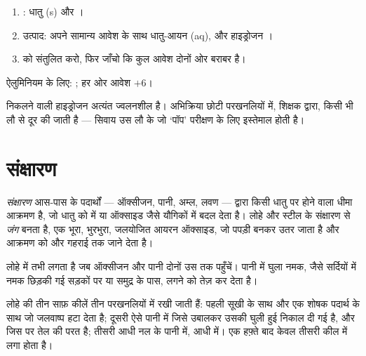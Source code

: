 \begin{method}[अम्ल के साथ धातु का समीकरण लिखना]\label{met:g9:metals-acids-corrosion:write}
\begin{enumerate}
  \item {}: धातु (s) और  ।
  \item उत्पाद: अपने सामान्य आवेश के साथ धातु-आयन (aq), और
        हाइड्रोजन ।
  \item {} को संतुलित करो, फिर जाँचो कि कुल आवेश दोनों ओर
        बराबर है।
\end{enumerate}
ऐलुमिनियम के लिए: ; हर ओर
आवेश $+6$।
\end{method}

\begin{safety}{}
निकलने वाली हाइड्रोजन अत्यंत ज्वलनशील है। अभिक्रिया छोटी परखनलियों में, शिक्षक
द्वारा, किसी भी लौ से दूर की जाती है --- सिवाय उस लौ के जो `पॉप' परीक्षण
के लिए इस्तेमाल होती है।
\end{safety}

\section{संक्षारण}

\begin{definition}[संक्षारण और जंग]\label{def:g9:metals-acids-corrosion:corrosion}
\emph{संक्षारण} आस-पास के पदार्थों --- ऑक्सीजन, पानी, अम्ल,
लवण --- द्वारा किसी धातु पर होने वाला धीमा आक्रमण है, जो धातु को  में या
ऑक्साइड जैसे यौगिकों में बदल देता है। लोहे और स्टील के संक्षारण से
\emph{जंग} बनता है, एक भूरा, भुरभुरा, जलयोजित
आयरन ऑक्साइड, जो पपड़ी बनकर उतर जाता है और आक्रमण को और गहराई तक जाने देता है।
\end{definition}

\begin{proposition}[लोहे को जंग लगने के लिए क्या चाहिए]\label{prop:g9:metals-acids-corrosion:needs}
लोहे में  तभी लगता है जब ऑक्सीजन और पानी दोनों उस तक पहुँचें। पानी में घुला
नमक, जैसे सर्दियों में नमक छिड़की गई सड़कों पर या समुद्र के पास, 
लगने को तेज़ कर देता है।
\end{proposition}

\begin{inthelab}[तीन कीलें, एक हफ़्ता]
लोहे की तीन साफ़ कीलें तीन परखनलियों में रखी जाती हैं: पहली सूखी  के साथ
और एक शोषक पदार्थ के साथ जो जलवाष्प हटा देता है; दूसरी ऐसे पानी में जिसे उबालकर
उसकी घुली हुई  निकाल दी गई है, और जिस पर तेल की परत है; तीसरी आधी नल के
पानी में, आधी  में। एक हफ़्ते बाद केवल तीसरी कील में
 लगा होता है।
\end{inthelab}

